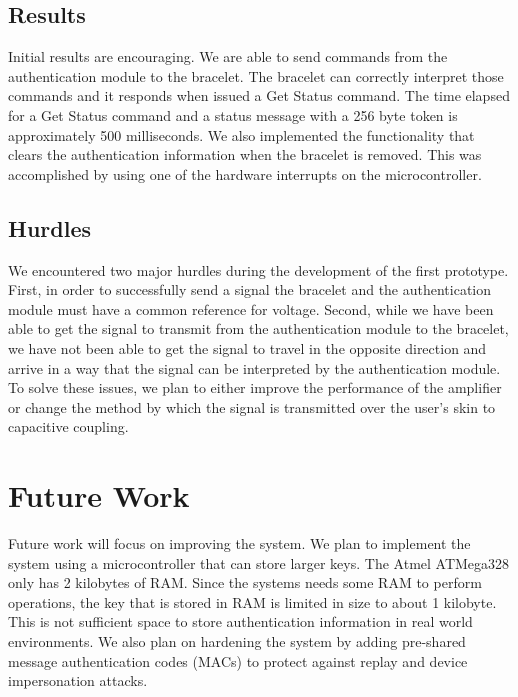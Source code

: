 \documentclass[runningheads,a4paper]{llncs}
\begin{document}
\subsection{Results}
Initial results are encouraging.  We are able to send commands from the authentication module to the bracelet.  The bracelet can correctly interpret those commands and it responds when issued a Get Status command.   The time elapsed for a Get Status command and a status message with a 256 byte token is approximately 500 milliseconds.  
We also implemented the functionality that clears the authentication information when the bracelet is removed.  This was accomplished by using one of the hardware interrupts on the microcontroller. 
\subsection{Hurdles}
We encountered two major hurdles during the development of the first prototype.  First, in order to successfully send a signal the bracelet and the authentication module must have a common reference for voltage.  Second, while we have been able to get the signal to transmit from the authentication module to the bracelet, we have not been able to get the signal to travel in the opposite direction and arrive in a way that the signal can be interpreted by the authentication module.  To solve these issues, we plan to either improve the performance of the amplifier or change the method by which the signal is transmitted over the user's skin to capacitive coupling.


\section{Future Work}\label{sec:future}
Future work will focus on improving the system.  We plan to implement the system using a microcontroller that can store larger keys.  The Atmel ATMega328 only has 2 kilobytes of RAM.  Since the systems needs some RAM to perform operations, the key that is stored in RAM is limited in size to about 1 kilobyte.  This is not sufficient space to store authentication information in real world environments.  We also plan on hardening the system by adding pre-shared message authentication codes (MACs) to protect against replay and device impersonation attacks.

\end{document}
